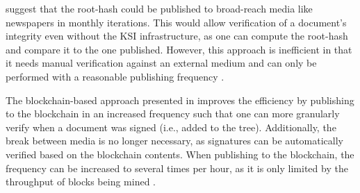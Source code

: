 \citeauthor{hutchison_keyless_2013} suggest that the root-hash could be published to broad-reach media like newspapers in monthly iterations. This would allow verification of a document's integrity even without the KSI infrastructure, as one can compute the root-hash and compare it to the one published. However, this approach is inefficient in that it needs manual verification against an external medium and can only be performed with a reasonable publishing frequency \cite{jamthagen_blockchain-based_2016}.

The blockchain-based approach presented in \cite{jamthagen_blockchain-based_2016} improves the efficiency by publishing to the blockchain in an increased frequency such that one can more granularly verify when a document was signed (i.e., added to the tree). Additionally, the break between media is no longer necessary, as signatures can be automatically verified based on the blockchain contents. When publishing to the blockchain, the frequency can be increased to several times per hour, as it is only limited by the throughput of blocks being mined \cite{jamthagen_blockchain-based_2016}.

